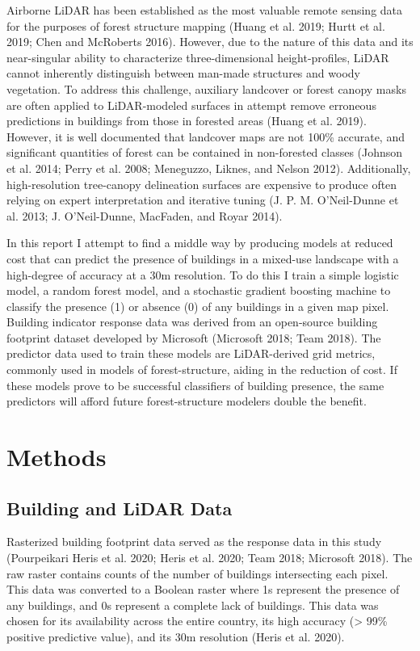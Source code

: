 \documentclass[review]{elsarticle} %
\begin{document}
Airborne LiDAR has been established as the most valuable remote sensing data for
the purposes of forest structure mapping (Huang et al. 2019; Hurtt et al. 2019; Chen and McRoberts 2016).
However, due to the nature of this data and its near-singular ability to
characterize three-dimensional height-profiles,
LiDAR cannot inherently distinguish between man-made structures and woody
vegetation.
To address this challenge, auxiliary landcover or forest canopy masks
are often applied to LiDAR-modeled surfaces in attempt remove erroneous
predictions in buildings from those in forested areas (Huang et al. 2019).
However, it is well documented that landcover maps are not 100\% accurate, and
significant quantities of forest can be contained in non-forested classes
(Johnson et al. 2014; Perry et al. 2008; Meneguzzo, Liknes, and Nelson 2012).
Additionally, high-resolution tree-canopy delineation surfaces are expensive
to produce often relying on expert interpretation and iterative tuning (J. P. M. O'Neil-Dunne et al. 2013; J. O'Neil-Dunne, MacFaden, and Royar 2014).

In this report I attempt to find a middle way by producing models at reduced
cost that can predict the presence of buildings in a mixed-use landscape with a high-degree of accuracy at a 30m resolution.
To do this I train a simple logistic model,
a random forest model, and a stochastic gradient boosting machine to classify
the presence (1) or absence (0) of any buildings in a given map pixel.
Building indicator response data was derived from an open-source building
footprint dataset developed by Microsoft (Microsoft 2018; Team 2018).
The predictor data used to train these models are LiDAR-derived grid metrics, commonly used in models of forest-structure, aiding in the reduction of cost.
If these models prove to be successful classifiers of building presence,
the same predictors will afford future forest-structure modelers double the
benefit.

\hypertarget{methods}{%
\section{Methods}\label{methods}}

\hypertarget{building-and-lidar-data}{%
\subsection{Building and LiDAR Data}\label{building-and-lidar-data}}

Rasterized building footprint data served as the response data in this study
(Pourpeikari Heris et al. 2020; Heris et al. 2020; Team 2018; Microsoft 2018).
The raw raster contains counts of the number of buildings intersecting each
pixel.
This data was converted to a Boolean raster where 1s represent the presence of
any buildings, and 0s represent a complete lack of buildings.
This data was chosen for its availability across the entire country, its high
accuracy (\textgreater{} 99\% positive predictive value), and its 30m resolution
(Heris et al. 2020).
\end{document}
